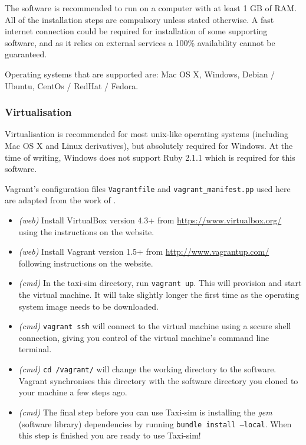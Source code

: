 The software is recommended to run on a computer with at least 1 GB of RAM. All
of the installation steps are compulsory unless stated otherwise. A fast
internet connection could be required for installation of some supporting
software, and as it relies on external services a 100\% availability cannot be
guaranteed.

Operating systems that are supported are: Mac OS X, Windows, Debian / Ubuntu,
CentOs / RedHat / Fedora.


\subsubsection{Virtualisation}
\label{sec:user_manual:installation:virtualisation}

Virtualisation is recommended for most unix-like operating systems (including
Mac OS X and Linux derivatives), but absolutely required for Windows. At the
time of writing, Windows does not support Ruby 2.1.1 which is required for this
software.

Vagrant's configuration files \texttt{Vagrantfile} and
\texttt{vagrant\_manifest.pp} used here are adapted from the work of
\textcite{Rails+dev+box}.

\begin{itemize}
  \item \textit{(web)} Install VirtualBox version 4.3+ \parencite{Virtualbox}
        from \url{https://www.virtualbox.org/} using the instructions on the
        website.
  \item \textit{(web)} Install Vagrant version 1.5+ \parencite{Vagrant} from 
        \url{http://www.vagrantup.com/} following instructions on the website.
  \item \textit{(cmd)} In the taxi-sim directory, run \texttt{vagrant up}. This
        will provision and start the virtual machine. It will take slightly
        longer the first time as the operating system image needs to be
        downloaded.
  \item \textit{(cmd)} \texttt{vagrant ssh} will connect to the virtual machine 
        using a secure shell connection, giving you control of the virtual
        machine's command line terminal.
  \item \textit{(cmd)} \texttt{cd /vagrant/} will change the working
        directory to the software. Vagrant synchronises this directory with the
        software directory you cloned to your machine a few steps ago.
  \item \textit{(cmd)} The final step before you can use Taxi-sim is installing
        the \textit{gem} (software library) dependencies by running 
        \texttt{bundle install --local}. When this step is finished you are ready to use Taxi-sim!
\end{itemize}



